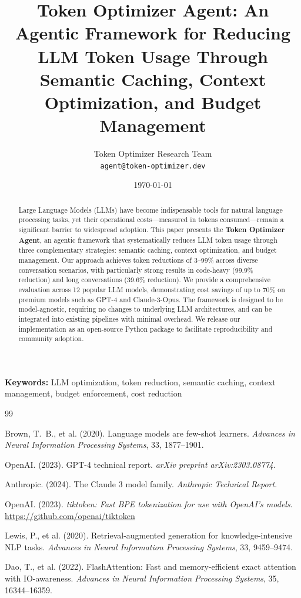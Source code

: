 \documentclass[11pt,a4paper]{article}
\title{\textbf{Token Optimizer Agent: An Agentic Framework for Reducing LLM Token Usage Through Semantic Caching, Context Optimization, and Budget Management}}
\author{
    Token Optimizer Research Team \\
    \texttt{agent@token-optimizer.dev}
}
\date{\today}
\begin{document}
\maketitle

\begin{abstract}
Large Language Models (LLMs) have become indispensable tools for natural language processing tasks, yet their operational costs---measured in tokens consumed---remain a significant barrier to widespread adoption. This paper presents the \textbf{Token Optimizer Agent}, an agentic framework that systematically reduces LLM token usage through three complementary strategies: semantic caching, context optimization, and budget management. Our approach achieves token reductions of 3--99\% across diverse conversation scenarios, with particularly strong results in code-heavy (99.9\% reduction) and long conversations (39.6\% reduction). We provide a comprehensive evaluation across 12 popular LLM models, demonstrating cost savings of up to 70\% on premium models such as GPT-4 and Claude-3-Opus. The framework is designed to be model-agnostic, requiring no changes to underlying LLM architectures, and can be integrated into existing pipelines with minimal overhead. We release our implementation as an open-source Python package to facilitate reproducibility and community adoption.
\end{abstract}

\noindent\textbf{Keywords:} LLM optimization, token reduction, semantic caching, context management, budget enforcement, cost reduction

\tableofcontents
\newpage










\begin{thebibliography}{99}

Brown, T.~B., et al. (2020).
Language models are few-shot learners.
\textit{Advances in Neural Information Processing Systems}, 33, 1877--1901.

OpenAI. (2023).
GPT-4 technical report.
\textit{arXiv preprint arXiv:2303.08774}.

Anthropic. (2024).
The Claude 3 model family.
\textit{Anthropic Technical Report}.

OpenAI. (2023).
\textit{tiktoken: Fast BPE tokenization for use with OpenAI's models}.
\url{https://github.com/openai/tiktoken}

Lewis, P., et al. (2020).
Retrieval-augmented generation for knowledge-intensive NLP tasks.
\textit{Advances in Neural Information Processing Systems}, 33, 9459--9474.

Dao, T., et al. (2022).
FlashAttention: Fast and memory-efficient exact attention with IO-awareness.
\textit{Advances in Neural Information Processing Systems}, 35, 16344--16359.

\end{thebibliography}

\appendix

\end{document}
